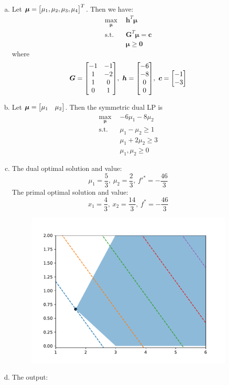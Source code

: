 \documentclass{article}
\def\bold#1{\boldsymbol{#1}}
\def\bc{\boldsymbol{c}}
\def\bh{\boldsymbol{h}}
\def\bG{\boldsymbol{G}}
\begin{document}
\begin{enumerate}[(a)]
    \item
		Let $\bold{\mu}=\mqty[\mu_1,\mu_2,\mu_3,\mu_4]^T$.
		Then we have:
		\[
		    \begin{aligned}
		        \max_{\bold{\mu}}\ \ 
				&
				\bh^T\bold{\mu}
				\\
				\mbox{s.t.}\ \ 
				&
				\bG^T\bold{\mu}=\bc
				\\
				&
				\bold{\mu}\ge\bold{0}
		    \end{aligned}
		\]
		where 
		\[
			\bG=\mqty[
				-1 & -1 \\
				1 & -2 \\
				1 & 0 \\
				0 & 1
			],\ 
			\bh=\mqty[-6 \\ -8 \\ 0 \\ 0]
			,\ 
			\bc=\mqty[-1 \\ -3]
		\] 
    \item
		Let $\bold{\mu}=\mqty[\mu_1 & \mu_2]$. Then the symmetric dual LP is
		\[
		    \begin{aligned}
		        \max_{\bold{\mu}}\ \ 
				&
				-6\mu_1-8\mu_2
				\\
				\mbox{s.t.}\ \ 
				&
				\mu_1-\mu_2\ge 1
				\\
				&
				\mu_1+2\mu_2\ge 3
				\\
				&
				\mu_1,\mu_2\ge 0
		    \end{aligned}
		\]
	\item
		The dual optimal solution and value:
		\[
			\mu_1=\frac{5}{3},\ \mu_2=\frac{2}{3},\ f'^*=-\frac{46}{3}
		\]
		The primal optimal solution and value:
		\[
			x_1=\frac{4}{3},\ x_2=\frac{14}{3},\ f^*=-\frac{46}{3}
		\]
		\begin{figure}[H]
			\centering
			\includegraphics[width=0.5\linewidth]{p3.pdf}
		\end{figure}
	\item
		The output:\\
		\texttt{
}
\end{enumerate}
\end{document}
